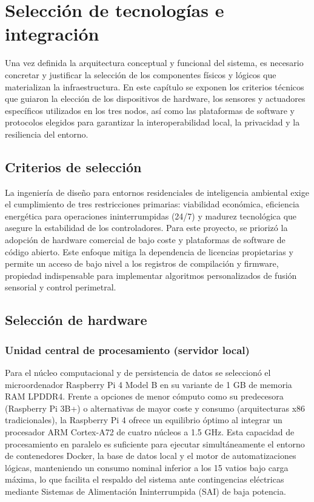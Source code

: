\newpage
\section{Selección de tecnologías e integración}
\label{cap:seleccion_tecnologias}

Una vez definida la arquitectura conceptual y funcional del sistema, es necesario concretar y justificar la selección de los componentes físicos y lógicos que materializan la infraestructura. En este capítulo se exponen los criterios técnicos que guiaron la elección de los dispositivos de hardware, los sensores y actuadores específicos utilizados en los tres nodos, así como las plataformas de software y protocolos elegidos para garantizar la interoperabilidad local, la privacidad y la resiliencia del entorno.

\subsection{Criterios de selección}
La ingeniería de diseño para entornos residenciales de inteligencia ambiental exige el cumplimiento de tres restricciones primarias: viabilidad económica, eficiencia energética para operaciones ininterrumpidas (24/7) y madurez tecnológica que asegure la estabilidad de los controladores. Para este proyecto, se priorizó la adopción de hardware comercial de bajo coste y plataformas de software de código abierto. Este enfoque mitiga la dependencia de licencias propietarias y permite un acceso de bajo nivel a los registros de compilación y firmware, propiedad indispensable para implementar algoritmos personalizados de fusión sensorial y control perimetral.

\subsection{Selección de hardware}

\subsubsection{Unidad central de procesamiento (servidor local)}
Para el núcleo computacional y de persistencia de datos se seleccionó el microordenador Raspberry Pi 4 Model B en su variante de 1 GB de memoria RAM LPDDR4. Frente a opciones de menor cómputo como su predecesora (Raspberry Pi 3B+) o alternativas de mayor coste y consumo (arquitecturas x86 tradicionales), la Raspberry Pi 4 ofrece un equilibrio óptimo al integrar un procesador ARM Cortex-A72 de cuatro núcleos a 1.5 GHz. Esta capacidad de procesamiento en paralelo es suficiente para ejecutar simultáneamente el entorno de contenedores Docker, la base de datos local y el motor de automatizaciones lógicas, manteniendo un consumo nominal inferior a los 15 vatios bajo carga máxima, lo que facilita el respaldo del sistema ante contingencias eléctricas mediante Sistemas de Alimentación Ininterrumpida (SAI) de baja potencia.

